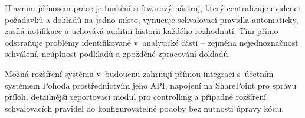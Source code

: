 Hlavním přínosem práce je funkční softwarový nástroj, který centralizuje
evidenci požadavků a dokladů na jedno místo, vynucuje schvalovací pravidla
automaticky, zasílá notifikace a uchovává auditní historii každého rozhodnutí.
Tím přímo odstraňuje problémy identifikované v~analytické části -- zejména
nejednoznačnost schválení, neúplnost podkladů a zpožděné zpracování dokladů.

Možná rozšíření systému v~budoucnu zahrnují přímou integraci s~účetním systémem
Pohoda prostřednictvím jeho API, napojení na SharePoint pro správu příloh,
detailnější reportovací modul pro controlling a případné rozšíření schvalovacích
pravidel do konfigurovatelné podoby bez nutnosti úpravy kódu.

